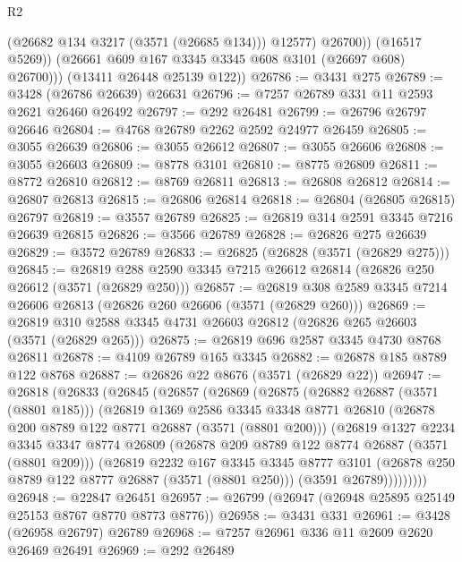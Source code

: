\begin{lexlean}{R2}
\begin{coremodule}
                  (@26682 @134 @3217 (@3571 (@26685 @134)))
                  @12577)
                @26700))
            (@16517 @5269))
          (@26661 @609 @167 @3345 @3345 @608 @3101 (@26697 @608) @26700)))
      (@13411 @26448 @25139 @122))
@26786 := @3431 @275
@26789 := @3428 (@26786 @26639) @26631
@26796 := @7257 @26789 @331 @11 @2593 @2621 @26460 @26492
@26797 := @292 @26481
@26799 := @26796 @26797 @26646
@26804 := @4768 @26789 @2262 @2592 @24977 @26459
@26805 := @3055 @26639
@26806 := @3055 @26612
@26807 := @3055 @26606
@26808 := @3055 @26603
@26809 := @8778 @3101
@26810 := @8775 @26809
@26811 := @8772 @26810
@26812 := @8769 @26811
@26813 := @26808 @26812
@26814 := @26807 @26813
@26815 := @26806 @26814
@26818 := @26804 (@26805 @26815) @26797
@26819 := @3557 @26789
@26825 := @26819 @314 @2591 @3345 @7216 @26639 @26815
@26826 := @3566 @26789
@26828 := @26826 @275 @26639
@26829 := @3572 @26789
@26833 := @26825 (@26828 (@3571 (@26829 @275)))
@26845 := @26819 @288 @2590 @3345 @7215 @26612 @26814 (@26826 @250 @26612 (@3571 (@26829 @250)))
@26857 := @26819 @308 @2589 @3345 @7214 @26606 @26813 (@26826 @260 @26606 (@3571 (@26829 @260)))
@26869 := @26819 @310 @2588 @3345 @4731 @26603 @26812 (@26826 @265 @26603 (@3571 (@26829 @265)))
@26875 := @26819 @696 @2587 @3345 @4730 @8768 @26811
@26878 := @4109 @26789 @165 @3345
@26882 := @26878 @185 @8789 @122 @8768
@26887 := @26826 @22 @8676 (@3571 (@26829 @22))
@26947 := @26818
    (@26833
      (@26845
        (@26857
          (@26869
            (@26875
              (@26882 @26887 (@3571 (@8801 @185)))
              (@26819
                @1369
                @2586
                @3345
                @3348
                @8771
                @26810
                (@26878 @200 @8789 @122 @8771 @26887 (@3571 (@8801 @200)))
                (@26819
                  @1327
                  @2234
                  @3345
                  @3347
                  @8774
                  @26809
                  (@26878 @209 @8789 @122 @8774 @26887 (@3571 (@8801 @209)))
                  (@26819
                    @2232
                    @167
                    @3345
                    @3345
                    @8777
                    @3101
                    (@26878 @250 @8789 @122 @8777 @26887 (@3571 (@8801 @250)))
                    (@3591 @26789)))))))))
@26948 := @22847 @26451
@26957 := @26799 (@26947 (@26948 @25895 @25149 @25153 @8767 @8770 @8773 @8776))
@26958 := @3431 @331
@26961 := @3428 (@26958 @26797) @26789
@26968 := @7257 @26961 @336 @11 @2609 @2620 @26469 @26491
@26969 := @292 @26489

\end{coremodule}
\end{lexlean}
